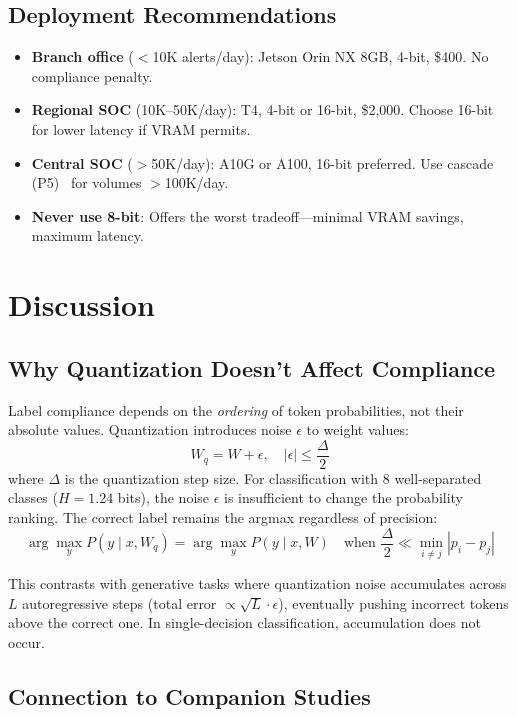\documentclass[journal]{IEEEtran}
\begin{document}
\subsection{Deployment Recommendations}
\begin{itemize}
\item \textbf{Branch office} ($<$10K alerts/day): Jetson Orin NX 8GB, 4-bit, \$400. No compliance penalty.
\item \textbf{Regional SOC} (10K--50K/day): T4, 4-bit or 16-bit, \$2,000. Choose 16-bit for lower latency if VRAM permits.
\item \textbf{Central SOC} ($>$50K/day): A10G or A100, 16-bit preferred. Use cascade (P5)~\cite{p5} for volumes $>$100K/day.
\item \textbf{Never use 8-bit}: Offers the worst tradeoff---minimal VRAM savings, maximum latency.
\end{itemize}

\section{Discussion}

\subsection{Why Quantization Doesn't Affect Compliance}
Label compliance depends on the \emph{ordering} of token probabilities, not their absolute values. Quantization introduces noise $\epsilon$ to weight values:
\begin{equation}
W_q = W + \epsilon, \quad |\epsilon| \leq \frac{\Delta}{2}
\end{equation}
where $\Delta$ is the quantization step size. For classification with 8 well-separated classes ($H = 1.24$ bits), the noise $\epsilon$ is insufficient to change the probability ranking. The correct label remains the argmax regardless of precision:
\begin{equation}
\arg\max_y P(y \mid x, W_q) = \arg\max_y P(y \mid x, W) \quad \text{when } \frac{\Delta}{2} \ll \min_{i \neq j} |p_i - p_j|
\end{equation}

This contrasts with generative tasks where quantization noise accumulates across $L$ autoregressive steps (total error $\propto \sqrt{L} \cdot \epsilon$), eventually pushing incorrect tokens above the correct one. In single-decision classification, accumulation does not occur.

\subsection{Connection to Companion Studies}
\end{document}
